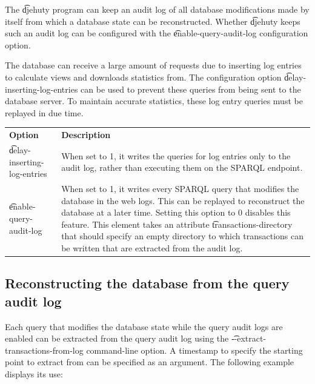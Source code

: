   The \t{djehuty} program can keep an audit log of all database modifications
  made by itself from which a database state can be reconstructed.  Whether
  \t{djehuty} keeps such an audit log can be configured with the
  \t{enable-query-audit-log} configuration option.

  The database can receive a large amount of requests due to inserting log
  entries to calculate views and downloads statistics from.  The configuration
  option \t{delay-inserting-log-entries} can be used to prevent these queries
  from being sent to the database server.  To maintain accurate statistics, these
  log entry queries must be replayed in due time.

\begin{tabularx}{\textwidth}{*{1}{!{\VRule[-1pt]}l}!{\VRule[-1pt]}X}
  \headrow
  \textbf{Option}            & \textbf{Description}\\
  \t{delay-inserting-log-entries} & When set to 1, it writes the 
                               queries for log entries only to the audit log,
                               rather than executing them on the SPARQL
                               endpoint.\\
  \t{enable-query-audit-log} & When set to 1, it writes every SPARQL query that
                               modifies the database in the web logs.  This can
                               be replayed to reconstruct the database at a
                               later time.  Setting this option to 0 disables
                               this feature.  This element takes an attribute
                               \t{transactions-directory} that should specify
                               an empty directory to which transactions can be
                               written that are extracted from the audit log.
\end{tabularx}

\subsection{Reconstructing the database from the query audit log}

  Each query that modifies the database state while the query audit logs
  are enabled can be extracted from the query audit log using the
  \t{-{}-extract-transactions-from-log} command-line option.  A timestamp to
  specify the starting point to extract from can be specified as an argument.
  The following example displays its use:

